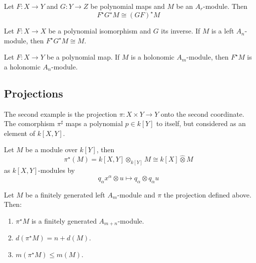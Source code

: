 \documentclass[12pt, oneside]{book}
\begin{document}
\begin{theorem}
    Let $F: X \rightarrow Y$ and $G: Y \rightarrow Z$ be polynomial maps and $M$ be an $A_r$-module. Then
    \begin{equation*}
        F^{\star} G^{\star} M \cong(G F)^{\star} M
    \end{equation*}
\end{theorem}

\begin{corollary}
    Let $F: X \rightarrow X$ be a polynomial isomorphism and $G$ its inverse. If $M$ is a left $A_n$-module, then $F^{\star} G^{\star} M \cong M$.
\end{corollary}


\begin{theorem}
    Let $F: X \rightarrow Y$ be a polynomial map. If $M$ is a holonomic $A_m$-module, then $F^{\star} M$ is a holonomic $A_n$-module.
\end{theorem}






\subsection{Projections}







\begin{example}
    The second example is the projection $\pi: X \times Y \rightarrow Y$ onto the second coordinate.
    The comorphism $\pi^{\sharp}$ maps a polynomial $p \in k[Y]$ to itself, but considered as an element of $k[X, Y]$.

    Let $M$ be a module over $k[Y]$, then
    \begin{equation*}
        \pi^{\star} \left(M\right)=k[X, Y] \otimes_{k[Y]} M \cong k[X] \widehat{\otimes}  M
    \end{equation*}
    as $k[X, Y]$-modules by
    \begin{equation*}
        q_\alpha x^\alpha \otimes u \longmapsto q_\alpha \otimes q_\alpha u
    \end{equation*}
\end{example}




\begin{theorem}
    Let $M$ be a finitely generated left $A_m$-module and $\pi$ the projection defined above. Then:
    \begin{enumerate}
        \item  $\pi^{\star} M$ is a finitely generated $A_{m+n}$-module.
        \item  $d\left(\pi^{\star} M\right)=n+d(M)$.
        \item  $m\left(\pi^{\star} M\right) \leq m(M)$.
    \end{enumerate}
\end{theorem}
\end{document}
